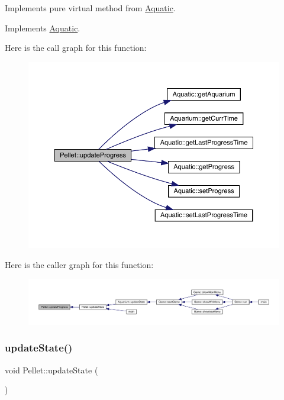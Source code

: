 Implements pure virtual method from \mbox{\hyperlink{class_aquatic}{Aquatic}}. 



Implements \mbox{\hyperlink{class_aquatic_ae1b6301ed27d6aadb73c7ee7879c24af}{Aquatic}}.

Here is the call graph for this function\+:\nopagebreak
\begin{figure}[H]
\begin{center}
\leavevmode
\includegraphics[width=350pt]{class_pellet_a1a7203cff52c771eb8cc62a91620e3ca_cgraph}
\end{center}
\end{figure}
Here is the caller graph for this function\+:
\nopagebreak
\begin{figure}[H]
\begin{center}
\leavevmode
\includegraphics[width=350pt]{class_pellet_a1a7203cff52c771eb8cc62a91620e3ca_icgraph}
\end{center}
\end{figure}
\mbox{\label{class_pellet_ab21f88899eba022e1693d911eba9dbfb}} 
\subsubsection{\texorpdfstring{update\+State()}{updateState()}}
{\footnotesize\ttfamily void Pellet\+::update\+State (\begin{DoxyParamCaption}{ }\end{DoxyParamCaption})\hspace{0.3cm}{\ttfamily [virtual]}}



